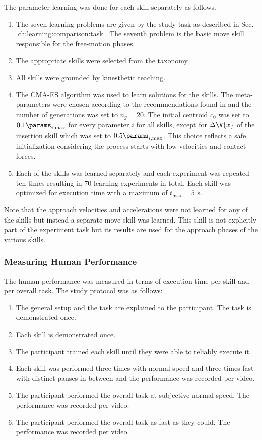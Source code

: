 The parameter learning was done for each skill separately as follows.
\begin{enumerate}
\item The seven learning problems are given by the study task as described in Sec. \ref{ch:learning:comparison:task}.
The seventh problem is the basic move skill responsible for the free-motion phases.
\item The appropriate skills were selected from the taxonomy.
\item All skills were grounded by kinesthetic teaching.
\item The CMA-ES algorithm was used to learn solutions for the skills.
The meta-parameters were chosen according to the recommendations found in \cite{FrancoisMicheldeRainville.15.02.2021} and the number of generations was set to $n_g=20$.
The initial centroid $c_0$ was set to $0.1 \params_{i,\text{max}}$ for every parameter $i$ for all skills, except for $\Delta \V{x}$ of the insertion skill which was set to $0.5 \params_{i,\text{max}}$.
This choice reflects a safe initialization considering the process starts with low velocities and contact forces.
\item Each of the skills was learned separately and each experiment was repeated ten times resulting in $70$ learning experiments in total.
Each skill was optimized for execution time with a maximum of $t_\text{max}=5$ s.
\end{enumerate}

Note that the approach velocities and accelerations were not learned for any of the skills but instead a separate move skill was learned.
This skill is not explicitly part of the experiment task but its results are used for the approach phases of the various skills.

\subsubsection{Measuring Human Performance}

The human performance was measured in terms of execution time per skill and per overall task. The study protocol was as follows:
\begin{enumerate}
\item The general setup and the task are explained to the participant. The task is demonstrated once.
\item Each skill is demonstrated once.
\item The participant trained each skill until they were able to reliably execute it.
\item Each skill was performed three times with normal speed and three times fast with distinct pauses in between and the performance was recorded per video.
\item The participant performed the overall task at subjective normal speed. The performance was recorded per video.
\item The participant performed the overall task as fast as they could. The performance was recorded per video.
\end{enumerate}

